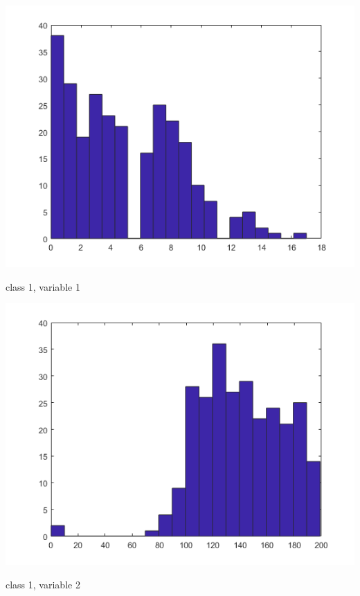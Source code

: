 \documentclass[a4paper]{article}
\begin{document}
\begin{center}
    \includegraphics[scale=1]{1-1.png}
    \caption{class 1, variable 1}
\end{center}

\begin{center}
    \includegraphics[scale=1]{1-2.png}
    \caption{class 1, variable 2}
\end{center}
\end{document}
